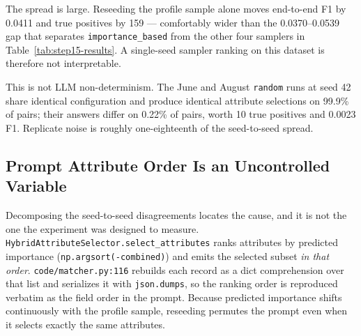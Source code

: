 \documentclass[11pt]{article}
\begin{document}
\begin{table}[htbp]
\centering
\small
{}
\caption{DBLP--ACM, \texttt{random} profile sampler over five seeds. Blocking is
held fixed across all five runs, so the candidate-pair set is identical and the only
varying input is which 50 pairs are profiled.}
\label{tab:dblp-seeds}
\end{table}

The spread is large. Reseeding the profile sample alone moves end-to-end F1 by
0.0411 and true positives by 159 --- comfortably wider than the 0.0370--0.0539 gap
that separates \texttt{importance\_based} from the other four samplers in
Table~\ref{tab:step15-results}. A single-seed sampler ranking on this dataset is
therefore not interpretable.

This is not LLM non-determinism. The June and August \texttt{random} runs at seed 42
share identical configuration and produce identical attribute selections on 99.9\% of
pairs; their answers differ on 0.22\% of pairs, worth 10 true positives and 0.0023
F1. Replicate noise is roughly one-eighteenth of the seed-to-seed spread.

\subsection{Prompt Attribute Order Is an Uncontrolled Variable}
\label{sec:ordering}

Decomposing the seed-to-seed disagreements locates the cause, and it is not the one
the experiment was designed to measure. \texttt{HybridAttributeSelector.select\_attributes}
ranks attributes by predicted importance (\texttt{np.argsort(-combined)}) and emits
the selected subset \emph{in that order}. \texttt{code/matcher.py:116} rebuilds each
record as a dict comprehension over that list and serializes it with
\texttt{json.dumps}, so the ranking order is reproduced verbatim as the field order
in the prompt. Because predicted importance shifts continuously with the profile
sample, reseeding permutes the prompt even when it selects exactly the same
attributes.
\end{document}
